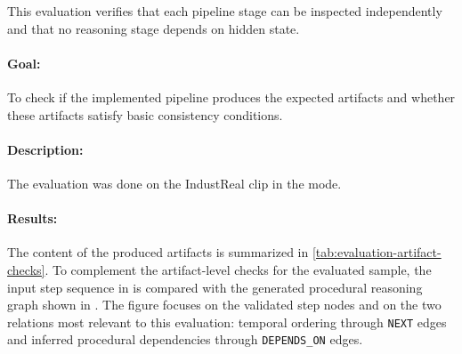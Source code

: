 This evaluation verifies that each pipeline stage can be inspected independently and
that no reasoning stage depends on hidden state.

\paragraph{Goal:}
To check if the implemented pipeline produces the expected artifacts and whether these artifacts satisfy basic consistency conditions. 

\paragraph{Description:}
The evaluation was done on the IndustReal clip  in the  mode.

\paragraph{Results:}
The content of the produced artifacts is summarized in \cref{tab:evaluation-artifact-checks}.
To complement the artifact-level checks for the evaluated sample, the input step sequence in  is compared with the generated procedural reasoning graph shown in . The figure focuses on the validated step nodes and on the two relations most relevant to this evaluation: temporal ordering through \texttt{NEXT} edges and inferred procedural dependencies through \texttt{DEPENDS\_ON} edges. 

